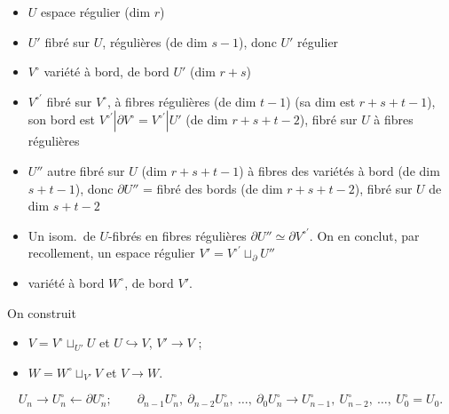 \documentclass[11pt,a4paper]{article}
\begin{document}
\begin{itemize}
  \item[1°)] $U$ espace régulier (dim $r$)
  \item[2°)] $U'$ fibré sur $U$,  régulières (de dim
  $s-1$), donc $U'$ régulier
  \item[3°)] $V^{\circ}$ variété à bord, de bord $U'$ (dim $r+s$)
  \item[4°)] $V^{\circ\prime}$ fibré sur $V^{\circ}$, à fibres régulières (de
  dim $t-1$) (sa dim est $r+s+t-1$), son bord est $V^{\circ\prime}|\partial
  V^{\circ} = V^{\circ\prime}|U'$ (de dim $r+s+t-2$), fibré sur $U$ à
  fibres régulières
  \item[5°)] $U''$ autre fibré sur $U$ (dim $r+s+t-1$) à fibres des
   variétés à bord (de dim $s+t-1$), donc
  $\partial U''$ = fibré des bords (de dim $r+s+t-2$), fibré sur $U$ de dim
  $s+t-2$
  \item[6°)] Un isom.\ de $U$-fibrés en fibres régulières $\partial U''
  \simeq \partial V^{\circ\prime}$. On en conclut, par recollement, un
  \struck{\ill{}} espace régulier $V' = V^{\circ\prime}
  \sqcup_{\partial} U''$
  \item[7°)]  variété à bord $W^{\circ}$, de bord $V'$.
\end{itemize}
On construit
\begin{itemize}
  \item[a)] $V = V^{\circ} \sqcup_{U'} U$ et $U \hookrightarrow V$, $V' \to
  V$ ;
  \item[b)]  $W = W^{\circ} \sqcup_{V'} V$ et $V \to W$.
\end{itemize}



\[
  U_n \to U_n^{\circ} \leftarrow \partial U_n^{\circ} ; \qquad
  \partial_{n-1} U_n^{\circ},\ \partial_{n-2} U_n^{\circ},\ \ldots,\
  \partial_0 U_n^{\circ} \longrightarrow U_{n-1}^{\circ},\
  U_{n-2}^{\circ},\ \ldots,\ U_0^{\circ} = U_0 .
\]
\end{document}
